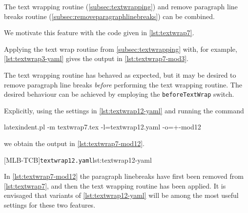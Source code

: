 	The%
	 text wrapping
	routine (\vref{subsec:textwrapping}) and remove paragraph line breaks routine
	(\vref{subsec:removeparagraphlinebreaks}) can be combined.

	We motivate this feature with the code given in \cref{lst:textwrap7}.


	Applying the text wrap routine from \vref{subsec:textwrapping} with, for example,
	\vref{lst:textwrap3-yaml} gives the output in \cref{lst:textwrap7-mod3}.


	The text wrapping routine has behaved as expected, but it may be desired to remove
	paragraph line breaks \emph{before} performing the text wrapping routine.
	The desired behaviour can be achieved by employing the \texttt{beforeTextWrap}
	switch.

	Explicitly, using the settings in \cref{lst:textwrap12-yaml} and running the command
	\begin{commandshell}
latexindent.pl -m textwrap7.tex -l=textwrap12.yaml -o=+-mod12
    \end{commandshell}
	we obtain the output in \cref{lst:textwrap7-mod12}.

	\begin{cmhtcbraster}
		[MLB-TCB]{\texttt{textwrap12.yaml}}{lst:textwrap12-yaml}
	\end{cmhtcbraster}

	In \cref{lst:textwrap7-mod12} the paragraph linebreaks have first been removed from
	\cref{lst:textwrap7}, and  then the text wrapping routine has been applied. It is
	envisaged that variants of \cref{lst:textwrap12-yaml} will be among the most useful
	settings for these two features.

